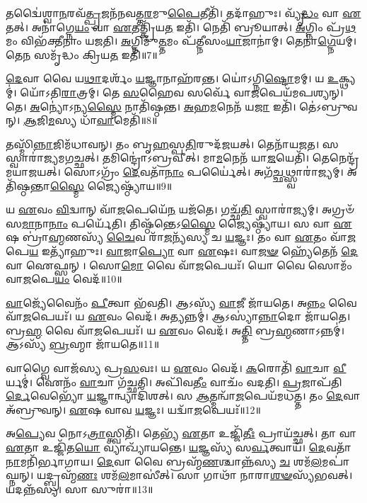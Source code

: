 𑌤𑌦𑍍𑌵𑍈॑𑌶𑍍𑌵𑌾\-\ul{𑌨}\-𑌰𑌵᳴\-\ul{𑌤𑍍𑌪𑍍𑌰}\-𑌜𑌨᳴𑌨𑌵𑌤𑍍𑌤\-\ul{𑌰}\-𑌮𑍁\-\ul{𑌪𑍈}\-𑌤𑍀𑌤𑌿᳴।
𑌤𑌦𑌾᳴𑌹𑍁𑌃।
𑌵𑍍𑌯𑍃᳴\-\ul{𑌦𑍍𑌧𑌂} 𑌵𑌾 \ul{𑌏}\-𑌤𑌤𑍍।
𑌅𑌨𑌾॑𑌗𑍍𑌨𑍇\-\ul{𑌯𑌂} 𑌵𑌾 \ul{𑌏}\-𑌤𑌤𑍍𑌕𑍍𑌰𑌿᳴𑌯\-\ul{𑌤} 𑌇𑌤𑌿᳴।
𑌨𑍇𑌤𑌿᳴ 𑌬𑍍𑌰𑍂𑌯𑌾𑌤𑍍।
\-\ul{𑌅}\-𑌗𑍍𑌨𑌿𑌂 𑌪𑍍𑌰᳴\-\ul{𑌥}\-𑌮𑌂 𑌵𑌿𑌭᳴𑌕𑍍𑌤𑍀𑌨𑌾𑌂 𑌯𑌜𑌤𑌿।
\-\ul{𑌅}\-𑌗𑍍𑌨𑌿𑌮𑍁᳴\-\ul{𑌤𑍍𑌤}\-𑌮𑌂 𑌪᳴𑌤𑍍𑌨𑍀𑌸𑌂\-\ul{𑌯𑌾}\-𑌜𑌾𑌨𑌾॑𑌮𑍍।
𑌤𑍇𑌨𑌾॑\-\ul{𑌗𑍍𑌨𑍇}\-𑌯𑌮𑍍।
𑌤𑍇\-\ul{𑌨} 𑌸𑌮𑍃᳴𑌦𑍍𑌧𑌂 𑌕𑍍𑌰𑌿𑌯\-\ul{𑌤} 𑌇𑌤𑌿᳴॥7॥\anuvakamend[\-\ul{𑌅}\-\-\ul{𑌰𑍁}\-\-\ul{𑌨𑍍𑌧}\-\-\ul{𑌤𑍈}\-𑌵 𑌤𑌦𑍍𑌭᳴𑌵\-\ul{𑌤𑌿} 𑌸𑌮𑍍𑌭𑍃᳴𑌤𑌸𑌮𑍍𑌭𑌾\-\ul{𑌰} 𑌇𑌤𑍍𑌯𑌾᳴𑌹𑍁\-\ul{𑌰𑌿}\-𑌚𑍍𑌛𑌤𑌿᳴ 𑌪𑌤𑍍𑌨𑍀𑌸𑌂\-\ul{𑌯𑌾}\-𑌜𑌾 𑌨𑌵᳴ 𑌚]

\-\ul{𑌦𑍇}\-𑌵𑌾 𑌵𑍈 𑌯\-\ul{𑌥𑌾}\-𑌦𑌰𑍍\mbox{}𑌶𑌂᳴ \ul{𑌯}\-𑌜𑍍𑌞𑌾𑌨𑌾𑌹᳴𑌰𑌨𑍍𑌤।
𑌯𑍋॑𑌽𑌗𑍍𑌨𑌿\-\ul{𑌷𑍍𑌟𑍋}\-𑌮𑌮𑍍।
𑌯 \ul{𑌉}\-𑌕𑍍𑌥𑍍𑌯𑌮𑍍॑।
𑌯𑍋᳴𑌽𑌤𑌿\-\ul{𑌰𑌾}\-𑌤𑍍𑌰𑌮𑍍।
𑌤𑍇 \ul{𑌸}\-𑌹𑍈𑌵 𑌸𑌰𑍍𑌵𑍇᳴ 𑌵𑌾\-\ul{𑌜}\-𑌪𑍇𑌯᳴𑌮𑌪𑌶𑍍𑌯𑌨𑍍।
𑌤𑍇।
\-\ul{𑌅}\-𑌨𑍍𑌯𑍋॑\-𑌽𑌨𑍍𑌯\-\ul{𑌸𑍍𑌮𑍈} 𑌨𑌾𑌤𑌿᳴𑌷𑍍𑌠𑌨𑍍𑌤।
\-\ul{𑌅}\-𑌹\-\ul{𑌮}\-𑌨𑍇𑌨᳴ 𑌯\-\ul{𑌜𑌾} 𑌇𑌤𑌿᳴।
𑌤𑍇॑𑌽𑌬𑍍𑌰𑍁𑌵𑌨𑍍।
\-\ul{𑌆}\-𑌜𑌿\-\ul{𑌮}\-𑌸𑍍𑌯 𑌧𑌾᳴\-\ul{𑌵𑌾}\-𑌮𑍇𑌤𑌿᳴॥8॥

𑌤𑌸𑍍𑌮𑌿᳴\-\ul{𑌨𑍍𑌨𑌾}\-𑌜𑌿𑌮᳴𑌧𑌾𑌵𑌨𑍍।
𑌤𑌂 𑌬𑍃\-\ul{𑌹}\-𑌸𑍍𑌪\-\ul{𑌤𑌿}\-𑌰𑍁𑌦᳴𑌜𑌯𑌤𑍍।
𑌤𑍇𑌨𑌾᳴𑌯𑌜𑌤।
𑌸 𑌸𑍍𑌵𑌾𑌰𑌾॑𑌜𑍍𑌯𑌮𑌗𑌚𑍍𑌛𑌤𑍍।
𑌤𑌮𑌿𑌨𑍍𑌦𑍍𑌰𑍋॑\-𑌽𑌬𑍍𑌰𑌵𑍀𑌤𑍍।
𑌮𑌾\-\ul{𑌮}\-𑌨𑍇𑌨᳴ 𑌯𑌾\-\ul{𑌜}\-𑌯𑍇𑌤𑌿᳴।
𑌤𑍇𑌨𑍇𑌨𑍍𑌦𑍍𑌰᳴𑌮𑌯𑌾𑌜𑌯𑌤𑍍।
𑌸𑍋𑌽𑌗𑍍𑌰𑌂᳴ \ul{𑌦𑍇}\-𑌵𑌤𑌾᳴\-\ul{𑌨𑌾𑌂} 𑌪𑌰𑍍𑌯𑍈॑𑌤𑍍।
𑌅𑌗᳴\-\ul{𑌚𑍍𑌛}\-𑌥𑍍𑌸𑍍𑌵𑌾𑌰𑌾॑𑌜𑍍𑌯𑌮𑍍।
𑌅𑌤𑌿᳴𑌷𑍍𑌠𑌨𑍍𑌤𑌾\-\ul{𑌸𑍍𑌮𑍈} 𑌜𑍍𑌯𑍈𑌷𑍍𑌠𑍍𑌯𑌾᳴𑌯॥9॥

𑌯 \ul{𑌏}\-𑌵𑌂 \ul{𑌵𑌿}\-𑌦𑍍𑌵𑌾𑌨𑍍 𑌵𑌾᳴\-\ul{𑌜}\-𑌪𑍇𑌯𑍇᳴\-\ul{𑌨} 𑌯𑌜᳴𑌤𑍇।
𑌗𑌚𑍍𑌛᳴\-\ul{𑌤𑌿} 𑌸𑍍𑌵𑌾𑌰𑌾॑𑌜𑍍𑌯𑌮𑍍।
𑌅𑌗𑍍𑌰𑍞᳴ 𑌸\-\ul{𑌮𑌾}\-𑌨𑌾\-\ul{𑌨𑌾𑌂} 𑌪𑌰𑍍𑌯𑍇᳴𑌤𑌿।
𑌤𑌿𑌷𑍍𑌠᳴𑌨𑍍𑌤𑍇\-𑌽\-\ul{𑌸𑍍𑌮𑍈} 𑌜𑍍𑌯𑍈𑌷𑍍𑌠𑍍𑌯𑌾᳴𑌯।
𑌸 𑌵𑌾 \ul{𑌏}\-𑌷 𑌬𑍍𑌰𑌾॑\-\ul{𑌹𑍍𑌮}\-𑌣𑌸𑍍𑌯᳴ \ul{𑌚𑍈}\-𑌵 𑌰𑌾᳴\-\ul{𑌜}\-𑌨𑍍𑌯᳴𑌸𑍍𑌯 𑌚 \ul{𑌯}\-𑌜𑍍𑌞𑌃।
𑌤𑌂 𑌵𑌾 \ul{𑌏}\-𑌤𑌂 𑌵𑌾᳴\-\ul{𑌜}\-𑌪𑍇\-\ul{𑌯} 𑌇𑌤𑍍𑌯𑌾᳴𑌹𑍁𑌃।
\-\ul{𑌵𑌾}\-𑌜𑌾\-\ul{𑌪𑍍𑌯𑍋} 𑌵𑌾 \ul{𑌏}\-𑌷𑌃।
𑌵𑌾\-\ul{𑌜}\-\-\ul{𑍟} 𑌹𑍍𑌯𑍇᳴𑌤𑍇𑌨᳴ \ul{𑌦𑍇}\-𑌵𑌾 𑌐𑌫𑍍𑌸𑌨𑍍।
𑌸𑍋\-\ul{𑌮𑍋} 𑌵𑍈 𑌵𑌾᳴\-\ul{𑌜}\-𑌪𑍇𑌯𑌃᳴।
𑌯𑍋 𑌵𑍈 𑌸𑍋𑌮𑌂᳴ 𑌵𑌾\-\ul{𑌜}\-𑌪𑍇\-\ul{𑌯𑌂} 𑌵𑍇𑌦᳴॥10॥

\-\ul{𑌵𑌾}\-𑌜𑍍𑌯𑍇᳴𑌵𑍈𑌨𑌂᳴ \ul{𑌪𑍀}\-𑌤𑍍𑌵𑌾 𑌭᳴𑌵𑌤𑌿।
𑌆𑌽𑌸𑍍𑌯᳴ \ul{𑌵𑌾}\-𑌜𑍀 𑌜𑌾᳴𑌯𑌤𑍇।
𑌅\-\ul{𑌨𑍍𑌨𑌂} 𑌵𑍈 𑌵𑌾᳴\-\ul{𑌜}\-𑌪𑍇𑌯𑌃᳴।
𑌯 \ul{𑌏}\-𑌵𑌂 𑌵𑍇𑌦᳴।
𑌅𑌤𑍍𑌯𑌨𑍍𑌨𑌮𑍍॑।
𑌆𑌽𑌸𑍍𑌯𑌾॑\-\ul{𑌨𑍍𑌨𑌾}\-𑌦𑍋 𑌜𑌾᳴𑌯𑌤𑍇।
𑌬𑍍𑌰\-\ul{𑌹𑍍𑌮} 𑌵𑍈 𑌵𑌾᳴\-\ul{𑌜}\-𑌪𑍇𑌯𑌃᳴।
𑌯 \ul{𑌏}\-𑌵𑌂 𑌵𑍇𑌦᳴।
𑌅\-\ul{𑌤𑍍𑌤𑌿} 𑌬𑍍𑌰\-\ul{𑌹𑍍𑌮}\-𑌣𑌾\-𑌽𑌨𑍍𑌨𑌮𑍍॑।
𑌆𑌽𑌸𑍍𑌯᳴ \ul{𑌬𑍍𑌰}\-𑌹𑍍𑌮𑌾 𑌜𑌾᳴𑌯𑌤𑍇॥11॥

𑌵𑌾𑌗𑍍𑌵𑍈 𑌵𑌾𑌜᳴𑌸𑍍𑌯 𑌪𑍍𑌰\-\ul{𑌸}\-𑌵𑌃।
𑌯 \ul{𑌏}\-𑌵𑌂 𑌵𑍇𑌦᳴।
\-\ul{𑌕}\-𑌰𑍋𑌤𑌿᳴ \ul{𑌵𑌾}\-𑌚𑌾 \ul{𑌵𑍀}\-𑌰𑍍𑌯𑌮𑍍॑।
𑌐𑌨𑌂᳴ \ul{𑌵𑌾}\-𑌚𑌾 𑌗᳴𑌚𑍍𑌛𑌤𑌿।
𑌅𑌪𑌿᳴𑌵\-\ul{𑌤𑍀𑌂} 𑌵𑌾𑌚𑌂᳴ 𑌵𑌦𑌤𑌿।
\-\ul{𑌪𑍍𑌰}\-𑌜𑌾𑌪᳴𑌤𑌿\-\ul{𑌰𑍍𑌦𑍇}\-𑌵𑍇𑌭𑍍𑌯𑍋᳴ \ul{𑌯}\-𑌜𑍍𑌞𑌾𑌨𑍍𑌵𑍍𑌯𑌾𑌦𑌿᳴𑌶𑌤𑍍।
𑌸 \ul{𑌆}\-𑌤𑍍𑌮𑌨𑍍𑌵𑌾᳴\-\ul{𑌜}\-𑌪𑍇𑌯᳴𑌮𑌧𑌤𑍍𑌤।
𑌤𑌂 \ul{𑌦𑍇}\-𑌵𑌾 𑌅᳴𑌬𑍍𑌰𑍁𑌵𑌨𑍍।
\-\ul{𑌏}\-𑌷 𑌵𑌾𑌵 \ul{𑌯}\-𑌜𑍍𑌞𑌃।
𑌯𑌦𑍍𑌵𑌾᳴\-\ul{𑌜}\-𑌪𑍇𑌯𑌃᳴॥12॥

𑌅\-\ul{𑌪𑍍𑌯𑍇}\-𑌵 𑌨𑍋𑌽\-\ul{𑌤𑍍𑌰𑌾}\-𑌸𑍍𑌤𑍍𑌵𑌿𑌤𑌿᳴।
𑌤𑍇𑌭𑍍𑌯᳴ \ul{𑌏}\-𑌤𑌾 𑌉𑌜𑍍𑌜𑌿᳴\-\ul{𑌤𑍀𑌃} 𑌪𑍍𑌰𑌾𑌯᳴𑌚𑍍𑌛𑌤𑍍।
𑌤𑌾 𑌵𑌾 \ul{𑌏}\-𑌤𑌾 𑌉𑌜𑍍𑌜𑌿᳴𑌤\-\ul{𑌯𑍋} 𑌵𑍍𑌯𑌾𑌖𑍍𑌯𑌾᳴𑌯𑌨𑍍𑌤𑍇।
\-\ul{𑌯}\-𑌜𑍍𑌞𑌸𑍍𑌯᳴ 𑌸\-\ul{𑌰𑍍𑌵}\-𑌤𑍍𑌵𑌾𑌯᳴।
\-\ul{𑌦𑍇}\-𑌵𑌤𑌾᳴\-\ul{𑌨𑌾}\-𑌮𑌨𑌿᳴𑌰𑍍𑌭𑌾𑌗𑌾𑌯।
\-\ul{𑌦𑍇}\-𑌵𑌾 𑌵𑍈 𑌬𑍍𑌰𑌹𑍍𑌮᳴\-\ul{𑌣}\-𑌶𑍍𑌚𑌾𑌨𑍍𑌨᳴𑌸𑍍𑌯 \ul{𑌚} 𑌶𑌮᳴\-\ul{𑌲}\-𑌮𑌪𑌾॑𑌘𑍍𑌨𑌨𑍍।
𑌯𑌦𑍍𑌬𑍍𑌰𑌹𑍍𑌮᳴\-\ul{𑌣𑌃} 𑌶𑌮᳴\-\ul{𑌲}\-𑌮𑌾𑌸𑍀॑𑌤𑍍।
𑌸𑌾 𑌗𑌾𑌥𑌾᳴ 𑌨𑌾𑌰𑌾\-\ul{𑌶}\-\-\ul{𑍟}\-𑌸𑍍𑌯᳴𑌭𑌵𑌤𑍍।
𑌯𑌦𑌨𑍍𑌨᳴𑌸𑍍𑌯।
𑌸𑌾 𑌸𑍁𑌰𑌾॑॥13॥

